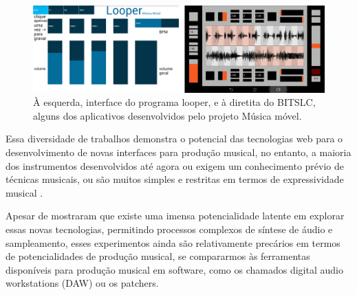 \begin{figure}[ht]
    \caption{\label{mmovel}À esquerda, interface do programa looper, e à diretita do B\/I\/T\/S\/L\/C, alguns dos aplicativos desenvolvidos pelo projeto Música móvel.}
    \begin{center}
        \includegraphics[width=1\linewidth]{pictures/cap2/musicamovel}
    \end{center}
\end{figure}





Essa diversidade de trabalhos demonstra o potencial das tecnologias web para o desenvolvimento de novas interfaces para produção musical, no entanto, a maioria dos instrumentos desenvolvidos até agora ou exigem um conhecimento prévio de técnicas musicais, ou são muitos simples e restritas em termos de expressividade musical \cite{Dobrian2006}. 


Apesar de mostraram que existe uma imensa potencialidade latente em explorar essas novas tecnologias, permitindo processos complexos de síntese de áudio e sampleamento, esses experimentos ainda são relativamente precários em termos de potencialidades de produção musical, se compararmos às ferramentas disponíveis para produção musical em software, como os chamados digital audio workstations (DAW) ou os patchers.
